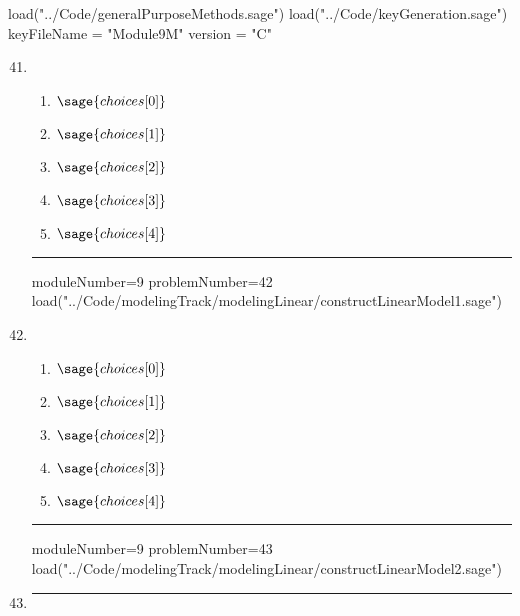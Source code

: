 \documentclass[14pt]{article}
\newcommand{\litem}[1]{\item#1\hspace*{-1cm}\rule{\textwidth}{0.4pt}}
\begin{document}
\pagestyle{fancy}

\begin{sagesilent}
load("../Code/generalPurposeMethods.sage")
load("../Code/keyGeneration.sage")
keyFileName = "Module9M"
version = "C"
\end{sagesilent}

\begin{enumerate}
\setcounter{enumi}{40}


\begin{sagesilent}
moduleNumber=9
problemNumber=41
load("../Code/modelingTrack/modelingLinear/domainLinear.sage")
\end{sagesilent}

\litem{ 


	\begin{enumerate}[label=\Alph*.]
  \item \( \sage{choices[0]} \)
  \item \( \sage{choices[1]} \)
  \item \( \sage{choices[2]} \)
  \item \( \sage{choices[3]} \)
  \item \( \sage{choices[4]} \)
	\end{enumerate}
}

\begin{sagesilent}
moduleNumber=9
problemNumber=42
load("../Code/modelingTrack/modelingLinear/constructLinearModel1.sage")
\end{sagesilent}

\litem{ 


	\begin{enumerate}[label=\Alph*.]
  \item \( \sage{choices[0]} \)
  \item \( \sage{choices[1]} \)
  \item \( \sage{choices[2]} \)
  \item \( \sage{choices[3]} \)
  \item \( \sage{choices[4]} \)
	\end{enumerate}
}

\begin{sagesilent}
moduleNumber=9
problemNumber=43
load("../Code/modelingTrack/modelingLinear/constructLinearModel2.sage")
\end{sagesilent}

\litem{ 

}
\end{enumerate}
\end{document}
